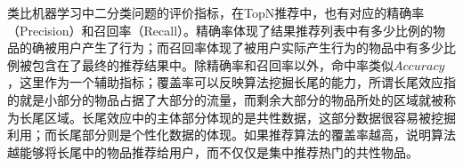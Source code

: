   类比机器学习中二分类问题的评价指标，在TopN推荐中，也有对应的精确率（Precision）和召回率（Recall）。精确率体现了结果推荐列表中有多少比例的物品的确被用户产生了行为；而召回率体现了被用户实际产生行为的物品中有多少比例被包含在了最终的推荐结果中。除精确率和召回率以外，命中率类似$Accuracy$，这里作为一个辅助指标；覆盖率可以反映算法挖掘长尾的能力，所谓长尾效应指的就是小部分的物品占据了大部分的流量，而剩余大部分的物品所处的区域就被称为长尾区域。长尾效应中的主体部分体现的是共性数据，这部分数据很容易被挖掘利用；而长尾部分则是个性化数据的体现\cite{曾洋2017基于电商的长尾推荐的研究与实现}。如果推荐算法的覆盖率越高，说明算法越能够将长尾中的物品推荐给用户，而不仅仅是集中推荐热门的共性物品。

